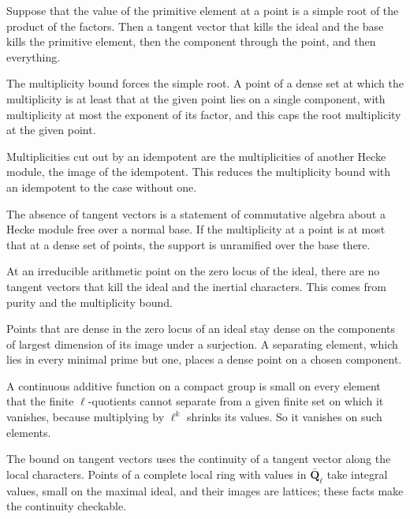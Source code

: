 Suppose that the value of the primitive element at a point is a simple root of the product of the factors. Then a tangent vector that kills the ideal and the base kills the primitive element, then the component through the point, and then everything.

The multiplicity bound forces the simple root. A point of a dense set at which the multiplicity is at least that at the given point lies on a single component, with multiplicity at most the exponent of its factor, and this caps the root multiplicity at the given point.

Multiplicities cut out by an idempotent are the multiplicities of another Hecke module, the image of the idempotent. This reduces the multiplicity bound with an idempotent to the case without one.

The absence of tangent vectors is a statement of commutative algebra about a Hecke module free over a normal base. If the multiplicity at a point is at most that at a dense set of points, the support is unramified over the base there.

At an irreducible arithmetic point on the zero locus of the ideal, there are no tangent vectors that kill the ideal and the inertial characters. This comes from purity and the multiplicity bound.

Points that are dense in the zero locus of an ideal stay dense on the components of largest dimension of its image under a surjection. A separating element, which lies in every minimal prime but one, places a dense point on a chosen component.

A continuous additive function on a compact group is small on every element that the finite $\ell$-quotients cannot separate from a given finite set on which it vanishes, because multiplying by $\ell^k$ shrinks its values. So it vanishes on such elements.

The bound on tangent vectors uses the continuity of a tangent vector along the local characters. Points of a complete local ring with values in $\bar{\mathbf Q}_\ell$ take integral values, small on the maximal ideal, and their images are lattices; these facts make the continuity checkable.

